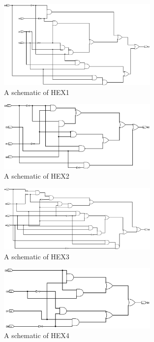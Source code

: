 \documentclass{article}
\begin{document}
\begin{enumerate}
\begin{figure}[ht!]
    \centering
    \includegraphics[width=0.7\textwidth]{part2_hex1.png}
    \caption{A schematic of HEX1}
    \label{f:part2_hex1}
\end{figure}

\begin{figure}[ht!]
    \centering
    \includegraphics[width=0.7\textwidth]{part2_hex2.png}
    \caption{A schematic of HEX2}
    \label{f:part2_hex2}
\end{figure}


\begin{figure}[ht!]
    \centering
    \includegraphics[width=0.7\textwidth]{part2_hex3.png}
    \caption{A schematic of HEX3}
    \label{f:part2_hex3}
\end{figure}

\begin{figure}[ht!]
    \centering
    \includegraphics[width=0.7\textwidth]{part2_hex4.png}
    \caption{A schematic of HEX4}
    \label{f:part2_hex4}
\end{figure}


\end{enumerate}
\end{document}
